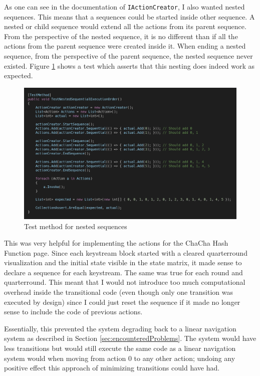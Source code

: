 As one can see in the documentation of \texttt{IActionCreator}, I also wanted nested sequences. This means that a sequences could be started inside other sequence. A nested or child sequence would extend all the actions from its parent sequence. From the perspective of the nested sequence, it is no different than if all the actions from the parent sequence were created inside it. When ending a nested sequence, from the perspective of the parent sequence, the nested sequence never existed. Figure \ref{fig:navsystem.test} shows a test which asserts that this nesting does indeed work as expected.
\begin{figure}
\centering
\includegraphics[width=\textwidth]{figures/code/nav-arch/TestNestedSequentialExecutionOrder.png}
\caption{Test method for nested sequences}
\label{fig:navsystem.test}
\end{figure}

This was very helpful for implementing the actions for the ChaCha Hash Function page. Since each keystream block started with a cleared quarterround visualization and the initial state visible in the state matrix, it made sense to declare a sequence for each keystream. The same was true for each round and quarterround. This meant that I would not introduce too much computational overhead inside the transitional code (even though only one transition was executed by design) since I could just reset the sequence if it made no longer sense to include the code of previous actions.

Essentially, this prevented the system degrading back to a linear navigation system as described in Section \ref{sec:encounteredProblems}. The system would have less transitions but would still execute the same code as a linear navigation system would when moving from action 0 to any other action; undoing any positive effect this approach of minimizing transitions could have had.

